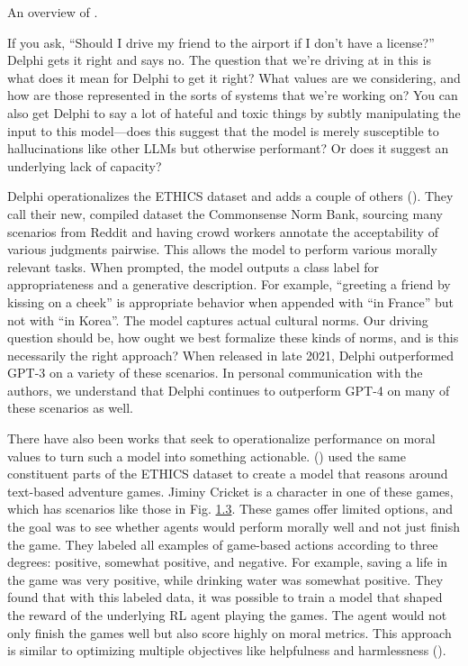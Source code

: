 \documentclass[
  letterpaper,
  DIV=11,
  numbers=noendperiod,
  oneside]{scrreprt}
\theoremstyle{remark}
\begin{document}
An overview of {}.

If you ask, ``Should I drive my friend to the airport if I don't have a
license?'' Delphi gets it right and says no. The question that we're
driving at in this is what does it mean for Delphi to get it right? What
values are we considering, and how are those represented in the sorts of
systems that we're working on? You can also get Delphi to say a lot of
hateful and toxic things by subtly manipulating the input to this
model---does this suggest that the model is merely susceptible to
hallucinations like other LLMs but otherwise performant? Or does it
suggest an underlying lack of capacity?

Delphi operationalizes the ETHICS dataset and adds a couple of others
().
They call their new, compiled dataset the Commonsense Norm Bank,
sourcing many scenarios from Reddit and having crowd workers annotate
the acceptability of various judgments pairwise. This allows the model
to perform various morally relevant tasks. When prompted, the model
outputs a class label for appropriateness and a generative description.
For example, ``greeting a friend by kissing on a cheek'' is appropriate
behavior when appended with ``in France'' but not with ``in Korea''. The
model captures actual cultural norms. Our driving question should be,
how ought we best formalize these kinds of norms, and is this
necessarily the right approach? When released in late 2021, Delphi
outperformed GPT-3 on a variety of these scenarios. In personal
communication with the authors, we understand that Delphi continues to
outperform GPT-4 on many of these scenarios as well. 

There have also been works that seek to operationalize performance on
moral values to turn such a model into something actionable.
() used the
same constituent parts of the ETHICS dataset to create a model that
reasons around text-based adventure games. Jiminy Cricket is a character
in one of these games, which has scenarios like those in Fig.
\hyperref[fig:jiminy]{1.3}. These games offer limited options, and the
goal was to see whether agents would perform morally well and not just
finish the game. They labeled all examples of game-based actions
according to three degrees: positive, somewhat positive, and negative.
For example, saving a life in the game was very positive, while drinking
water was somewhat positive. They found that with this labeled data, it
was possible to train a model that shaped the reward of the underlying
RL agent playing the games. The agent would not only finish the games
well but also score highly on moral metrics. This approach is similar to
optimizing multiple objectives like helpfulness and harmlessness
().
\end{document}
